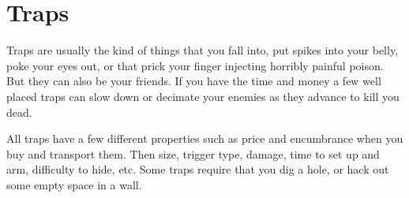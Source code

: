 







\section*{Traps}

Traps are usually the kind of things that you fall into, put spikes into your belly, poke your eyes out, or that prick your finger injecting horribly painful poison. But they can also be your friends. If you have the time and money a few well placed traps can slow down or decimate your enemies as they advance to kill you dead.

All traps have a few different properties such as price and encumbrance when you buy and transport them. Then size, trigger type, damage, time to set up and arm, difficulty to hide, etc. Some traps require that you dig a hole, or hack out some empty space in a wall.

